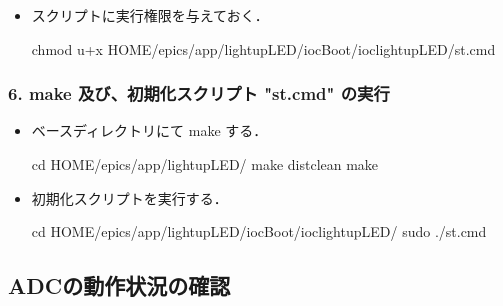 \documentclass[letterpaper,10pt,dvipdfmx]{sphinxmanual}
\begin{document}
\begin{itemize}
\begin{quote}
\begin{sphinxVerbatim}[commandchars=\\\{\}]
\end{sphinxVerbatim}
\sphinxresetverbatimhllines

\begin{sphinxadmonition}{warning}{Warning:}
(隘路事項) dbLoadRecord, dbLoadDatabaseの順番が逆になったりすると、うまく動作しない．しかも、".db"ファイルの１行目がおかしいというエラーメッセージがでるので、ミスリーディングである．st.cmd前後の状態も確認すべきである．
\end{sphinxadmonition}
\end{quote}

\item {} 
スクリプトに実行権限を与えておく．

\begin{sphinxVerbatim}[commandchars=\\\{\}]
\PYGZdl{} chmod u+x \PYGZdl{}HOME/epics/app/lightupLED/iocBoot/ioclightupLED/st.cmd
\end{sphinxVerbatim}

\end{itemize}


\subsubsection{6. make 及び、初期化スクリプト "st.cmd" の実行}
\label{\detokenize{epics/rst/example3__arduino_LEDcontrol01:make-st-cmd}}\begin{itemize}
\item {} 
ベースディレクトリにて make する．

\begin{sphinxVerbatim}[commandchars=\\\{\}]
\PYGZdl{} cd \PYGZdl{}HOME/epics/app/lightupLED/
\PYGZdl{} make distclean
\PYGZdl{} make
\end{sphinxVerbatim}

\item {} 
初期化スクリプトを実行する．

\begin{sphinxVerbatim}[commandchars=\\\{\}]
\PYGZdl{} cd \PYGZdl{}HOME/epics/app/lightupLED/iocBoot/ioclightupLED/
\PYGZdl{} sudo ./st.cmd
\end{sphinxVerbatim}

\end{itemize}


\subsection{ADCの動作状況の確認}
\label{\detokenize{epics/rst/example3__arduino_LEDcontrol01:adc}}
\end{document}

